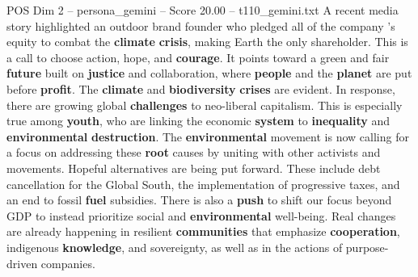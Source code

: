 \begin{textsample}{POS Dim 2 – persona\_gemini – Score 20.00 – t110\_gemini.txt}  \label{ex:f2_pos_047}
A recent media story highlighted an outdoor brand founder who pledged all of the company 's equity to combat the \textbf{climate} \textbf{crisis}, making Earth the only shareholder.
This is a call to choose action, hope, and \textbf{courage}.
It points toward a green and fair \textbf{future} built on \textbf{justice} and collaboration, where \textbf{people} and the \textbf{planet} are put before \textbf{profit}.
The \textbf{climate} and \textbf{biodiversity} \textbf{crises} are evident.
In response, there are growing global \textbf{challenges} to neo-liberal capitalism.
This is especially true among \textbf{youth}, who are linking the economic \textbf{system} to \textbf{inequality} and \textbf{environmental} \textbf{destruction}.
The \textbf{environmental} movement is now calling for a focus on addressing these \textbf{root} causes by uniting with other activists and movements.
Hopeful alternatives are being put forward.
These include debt cancellation for the Global South, the implementation of progressive taxes, and an end to fossil \textbf{fuel} subsidies.
There is also a \textbf{push} to shift our focus beyond GDP to instead prioritize social and \textbf{environmental} well-being.
Real changes are already happening in resilient \textbf{communities} that emphasize \textbf{cooperation}, indigenous \textbf{knowledge}, and sovereignty, as well as in the actions of purpose-driven companies.

\end{textsample}
